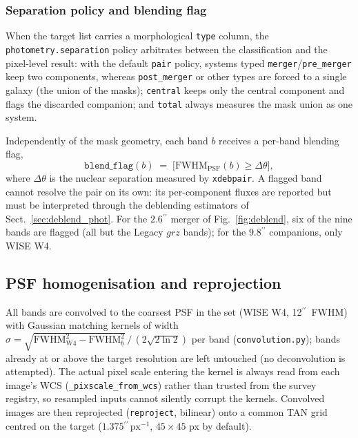 \documentclass{aa}
\newcommand{\xdebpair}{\texttt{xdebpair}}
\newcommand{\arcsecond}{\ensuremath{^{\prime\prime}}}
\begin{document}
\subsubsection{Separation policy and blending flag}
\label{sec:separation_policy}

When the target list carries a morphological \texttt{type} column, the
\texttt{photometry.separation} policy arbitrates between the
classification and the pixel-level result: with the default
\texttt{pair} policy, systems typed \texttt{merger}/\texttt{pre\_merger}
keep two components, whereas \texttt{post\_merger} or other types are
forced to a single galaxy (the union of the masks); \texttt{central}
keeps only the central component and flags the discarded companion; and
\texttt{total} always measures the mask union as one system.

Independently of the mask geometry, each band $b$ receives a per-band
blending flag,
\begin{equation}
\texttt{blend\_flag}(b) \;=\;
\bigl[\mathrm{FWHM}_\mathrm{PSF}(b) \geq \Delta\theta\bigr] ,
\label{eq:blendflag}
\end{equation}
where $\Delta\theta$ is the nuclear separation measured by \xdebpair. A
flagged band cannot resolve the pair on its own: its per-component fluxes
are reported but must be interpreted through the deblending estimators of
Sect.~\ref{sec:deblend_phot}. For the $2.6\arcsecond$ merger of
Fig.~\ref{fig:deblend}, six of the nine bands are flagged (all but the
Legacy $grz$ bands); for the $9.8\arcsecond$ companions, only WISE W4.

\subsection{PSF homogenisation and reprojection}
\label{sec:psf}

All bands are convolved to the coarsest PSF in the set (WISE W4,
12\arcsecond\ FWHM) with Gaussian matching kernels of width
$\sigma = \sqrt{\mathrm{FWHM}_\mathrm{W4}^2 - \mathrm{FWHM}_b^2}\,/\,
(2\sqrt{2\ln 2})$ per band (\texttt{convolution.py}); bands already at or
above the target resolution are left untouched (no deconvolution is
attempted). The actual pixel scale entering the kernel is always read
from each image's WCS (\texttt{\_pixscale\_from\_wcs}) rather than
trusted from the survey registry, so resampled inputs cannot silently
corrupt the kernels. Convolved images are then reprojected
(\texttt{reproject}, bilinear) onto a common TAN grid centred on the
target ($1.375\arcsecond\,\mathrm{px}^{-1}$, $45\times45$ px by default).
\end{document}
